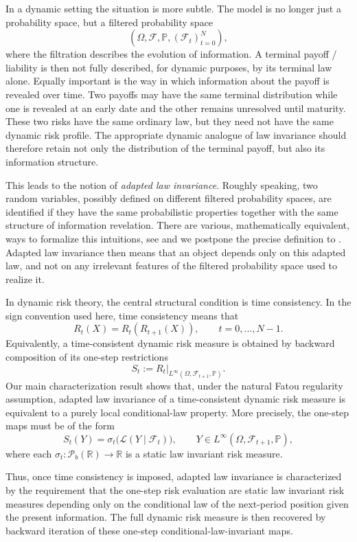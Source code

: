 \documentclass[a4paper]{amsart}
\theoremstyle{definition}
\newcommand{\F}{\mathcal{F}}
\newcommand{\law}{\mathcal{L}}
\newcommand{\Pc}{\mathcal P}
\renewcommand{\P}{\mathbb{P}}
\begin{document}
In a dynamic setting the situation is more subtle. The model is no longer just
a probability space, but a filtered probability space
\[
(\Omega,\F,\P,(\F_t)_{t=0}^N),
\]
where the filtration describes the evolution of information. A terminal payoff / liability 
is then not fully described, for dynamic purposes, by its terminal law alone.
Equally important is the way in which information about the payoff is revealed
over time. Two payoffs may have the same terminal distribution while one is
revealed at an early date and the other remains unresolved until maturity.
These two risks have the same ordinary law, but they need not have the same
dynamic risk profile. The appropriate dynamic analogue of law invariance should
therefore retain not only the distribution of the terminal payoff, but also its
information structure.

This leads to the notion of \emph{adapted law invariance}. Roughly speaking, two
random variables, possibly defined on different filtered probability spaces,
are identified if they have the same probabilistic properties together with the
same structure of information revelation. There are various, mathematically equivalent, ways to formalize this intuitions, see \cite{HoKe84, Pf09, BaBePa21, BeiglProbabilistic2024} and we postpone the precise definition to
. Adapted law invariance then means that an object depends
only on this adapted law, and not on any irrelevant features of the filtered
probability space used to realize it.

In dynamic risk theory, the central
structural condition is time consistency. In the sign convention used here,
time consistency means that
\[
R_t(X)=R_t( R_{t+1}(X)),
\qquad t=0,\dots,N-1.
\]
Equivalently, a time-consistent dynamic risk measure is obtained by backward
composition of its one-step restrictions
\[
 S_t:=
 R_t\big|_{L^\infty(\Omega,\F_{t+1},\P)}.
\]
Our  main characterization result shows that, under the natural Fatou regularity
assumption, adapted law invariance of a time-consistent dynamic risk measure is
equivalent to a purely local conditional-law property. More precisely, the
one-step maps must be of the form
\[
S_t(Y)
=
\sigma_t\bigl(\law(Y\mid\F_t)\bigr),
\qquad
Y\in L^\infty(\Omega,\F_{t+1},\P),
\]
where each $\sigma_t:\Pc_b(\mathbb R)\to\mathbb R$ is a static law invariant risk measure.

Thus, once time consistency is imposed, adapted law invariance is characterized
by the requirement that the one-step risk evaluation are static law invariant risk measures depending  only on the
conditional law of the next-period position given the present information. The
full dynamic risk measure is then recovered by backward iteration of these
one-step conditional-law-invariant maps.
\end{document}
